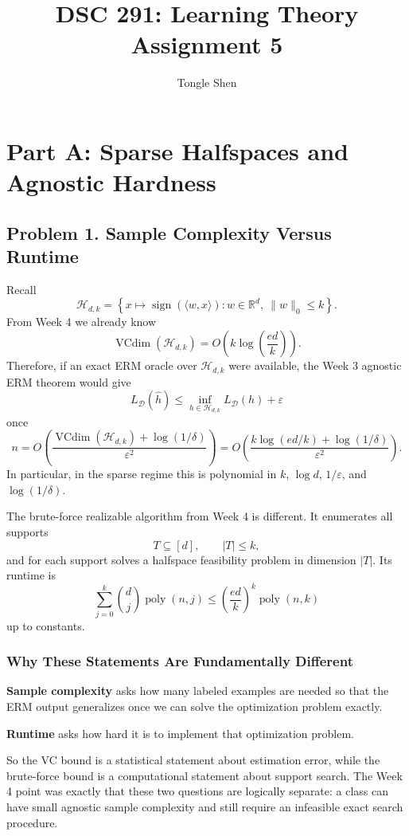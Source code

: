 \documentclass{article}
\title{DSC 291: Learning Theory Assignment 5}
\author{Tongle Shen}
\DeclareMathOperator{\VC}{VCdim}
\DeclareMathOperator{\sign}{sign}
\newcommand{\cH}{\mathcal{H}}
\newcommand{\cD}{\mathcal{D}}
\begin{document}
\maketitle

\section{Part A: Sparse Halfspaces and Agnostic Hardness}

\subsection{Problem 1. Sample Complexity Versus Runtime}

Recall
$$
\cH_{d,k}
=
\left\{
x \mapsto \sign(\langle w,x\rangle)
:
w \in \mathbb{R}^d,\ \|w\|_0 \le k
\right\}.
$$
From Week 4 we already know
$$
\VC(\cH_{d,k})
=
O\!\left(
k\log\!\left(\frac{ed}{k}\right)
\right).
$$
Therefore, if an exact ERM oracle over $\cH_{d,k}$ were available, the Week 3 agnostic ERM theorem would give
$$
L_{\cD}(\widehat{h})
\le
\inf_{h\in \cH_{d,k}} L_{\cD}(h) + \varepsilon
$$
once
$$
n
=
O\!\left(
\frac{
\VC(\cH_{d,k})+\log(1/\delta)
}{
\varepsilon^2
}
\right)
=
O\!\left(
\frac{
k\log(ed/k)+\log(1/\delta)
}{
\varepsilon^2
}
\right).
$$
In particular, in the sparse regime this is polynomial in $k$, $\log d$, $1/\varepsilon$, and $\log(1/\delta)$.

The brute-force realizable algorithm from Week 4 is different. It enumerates all supports
$$
T\subseteq[d],
\qquad
|T|\le k,
$$
and for each support solves a halfspace feasibility problem in dimension $|T|$. Its runtime is
$$
\sum_{j=0}^k \binom{d}{j}\operatorname{poly}(n,j)
\le
\left(\frac{ed}{k}\right)^k \operatorname{poly}(n,k)
$$
up to constants.

\subsubsection{Why These Statements Are Fundamentally Different}

\textbf{Sample complexity} asks how many labeled examples are needed so that the ERM output generalizes once we can solve the optimization problem exactly.

\textbf{Runtime} asks how hard it is to implement that optimization problem.

So the VC bound is a statistical statement about estimation error, while the brute-force bound is a computational statement about support search. The Week 4 point was exactly that these two questions are logically separate: a class can have small agnostic sample complexity and still require an infeasible exact search procedure.
\end{document}
